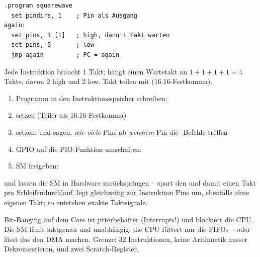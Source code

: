 \begin{bsp}
\begin{lstlisting}
.program squarewave
  set pindirs, 1    ; Pin als Ausgang
again:
  set pins, 1 [1]   ; high, dann 1 Takt warten
  set pins, 0       ; low
  jmp again         ; PC = again
\end{lstlisting}
Jede Instruktion braucht 1 Takt; \R{[1]} hängt einen Wartetakt an
\ra $1+1+1+1 = 4$ Takte, davon 2 high und 2 low. Takt teilen mit
 (16.16-Festkomma).
\end{bsp}

\begin{rezept}
\begin{enumerate}
\item Programm in den Instruktionsspeicher schreiben:
\item {} setzen (Teiler als 16.16-Festkomma)
\item {} setzen:  und  sagen,
      \emph{wie viele} Pins ab \emph{welchem} Pin die -Befehle
      treffen
\item GPIO auf die PIO-Funktion umschalten:
\item SM freigeben: 
\end{enumerate}
\end{rezept}

  und  lassen die SM in Hardware
zurückspringen -- spart den  und damit einen Takt pro
Schleifendurchlauf.  legt gleichzeitig zur Instruktion Pins
um, ebenfalls ohne eigenen Takt; so entstehen exakte Taktsignale.

\begin{falle}
Bit-Banging auf dem Core ist jitterbehaftet (Interrupts!) und blockiert
die CPU. Die SM läuft taktgenau und unabhängig, die CPU füttert nur die
FIFOs -- oder lässt das den DMA machen. Grenze: 32 Instruktionen,
keine Arithmetik ausser Dekrementieren, und zwei Scratch-Register.
\end{falle}


